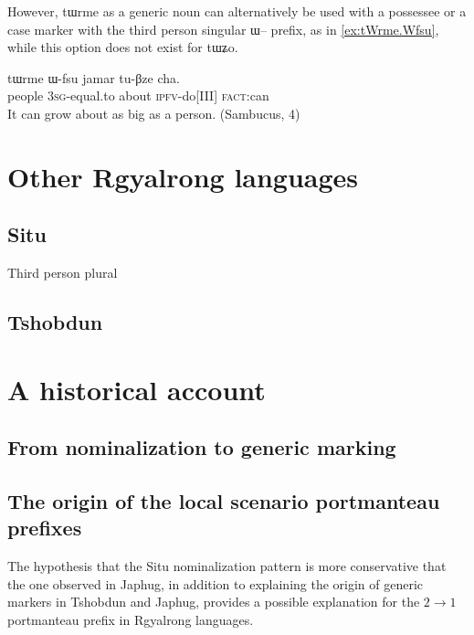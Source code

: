 \documentclass[oldfontcommands,oneside,a4paper,11pt]{article}
\newcommand{\ipa}[1]{{\phon \mbox{#1}}} %
\begin{document}
However, \ipa{tɯrme} as a generic noun can alternatively be used with a possessee or a case marker with the third person singular \ipa{ɯ--} prefix, as in \ref{ex:tWrme.Wfsu}, while this option does not exist for \ipa{tɯʑo}.

\begin{exe}
\ex  \label{ex:tWrme.Wfsu}
\gll
 	\ipa{tɯrme} 	\ipa{ɯ-fsu} 	\ipa{jamar} 	\ipa{tu-βze} 	\ipa{cha.} \\
people \textsc{3sg}-equal.to about \textsc{ipfv}-do[III] \textsc{fact}:can \\
\glt It can grow about as big as a person. (Sambucus, 4)
\end{exe}
 
 

\section{Other Rgyalrong languages}
\subsection{Situ}
\citet{linxr93jiarong}
\citet[163]{lin09phd}

Third person plural

\citet[101-102]{jacques12agreement}
\subsection{Tshobdun}
\citet{sun14generic}
\section{A historical account}

\subsection{From nominalization to generic marking}

\subsection{The origin of the local scenario portmanteau prefixes}
The hypothesis that the Situ nominalization pattern is more conservative that the one observed in Japhug, in addition to explaining the origin of generic markers in Tshobdun and Japhug, provides a possible explanation for the  $2\rightarrow1$ portmanteau prefix in Rgyalrong languages.
\end{document}

